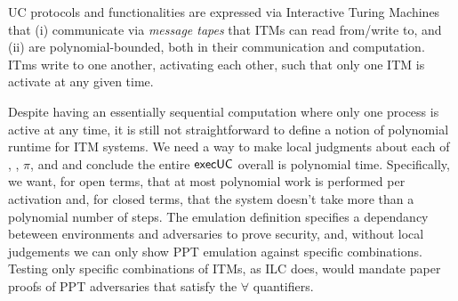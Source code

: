 UC protocols and functionalities are expressed via Interactive Turing Machines that (i) communicate via \emph{message tapes} that ITMs can read from/write to,
and (ii) are polynomial-bounded, both in their communication and computation.
ITms write to one another, activating each other, such that only one ITM is activate at any given time.

Despite having an essentially sequential computation where only one process is active at any time,
it is still not straightforward to define a notion of polynomial runtime for ITM systems.
We need a way to make local judgments about each of \A, \Z, $\pi$, and \F and conclude the entire ${\mathsf {execUC}}$ overall is polynomial time. 
Specifically, we want, for open terms, that at most polynomial work is performed per activation and, for closed terms, that the system doesn't take more than a polynomial number of steps.
The emulation definition specifies a dependancy beteween environments and adversaries to prove security, and, without local judgements we can only show PPT emulation against specific combinations.
Testing only specific combinations of ITMs, as ILC does, would mandate paper proofs of PPT adversaries that satisfy the $\forall$ quantifiers.

